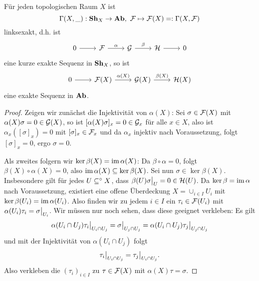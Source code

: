 \begin{lemma}
    \label{lemma:raum in garbe einsetzen ist linksexakt}
    Für jeden topologischen Raum $X$ ist
    \[\Gamma(X,\_): \mathbf{Sh}_X \to \mathbf{Ab},\ \mathcal{F} \mapsto \mathcal{F}(X) =: \Gamma(X,\mathcal{F})\] 
    linksexakt,
    d.h. ist
    \[\begin{tikzcd}
        0 \rar & \F \rar{\alpha} & \G \rar{\beta} & \cal H \rar & 0
    \end{tikzcd}\]
    eine kurze exakte Sequenz in $\mathbf{Sh}_X$, so ist
    \[\begin{tikzcd}
        0 \rar & \F(X) \rar{\alpha(X)} & \G(X) \rar{\beta(X)} & 
        \cal H(X)
    \end{tikzcd}\]
    eine exakte Sequenz in $\mathbf{Ab}$.
\end{lemma}
\begin{proof}
    Zeigen wir zunächst die Injektivität von $\alpha(X)$: Sei
    $\sigma \in \mathcal{F}(X)$ mit $\alpha(X)\sigma = 0\in \mathcal{G}(X)$, so ist
    $[\alpha(X)\sigma]_x  = 0 \in \mathcal{G}_x$ für alle $x \in X$, also ist
    $\alpha_x([\sigma]_x) = 0$ mit $[\sigma]_x \in \mathcal{F}_x$
    und da $\alpha_x$ injektiv nach Voraussetzung, folgt
    $[\sigma]_x = 0$, ergo $\sigma = 0$.
    
    Als zweites folgern wir $\ker \beta(X) = \operatorname{im} \alpha(X)$:
    Da $\beta \circ \alpha = 0$, folgt $\beta(X) \circ \alpha(X) = 0$,
    also $\operatorname{im}\alpha(X) \subseteq \ker \beta (X)$.
    Sei nun $\sigma \in \ker\beta (X)$. Insbesondere gilt für jedes 
    $U \subseteq^\circ X$, dass $\beta(U)\sigma\big|_{U} = 0 \in \mathcal H(U)$.
    Da $\ker \beta = \operatorname{im}\alpha$ nach Voraussetzung, existiert eine
    offene Überdeckung $X = \cup_{i\in I} U_i$ mit 
    $\ker\beta(U_i) = \operatorname{im}\alpha(U_i)$. Also finden wir zu jedem
    $i \in I$ ein $\tau_i \in \mathcal{F}(U_i)$ mit 
    $\alpha(U_i)\tau_i = \sigma\big|_{U_i}$. Wir müssen nur noch sehen, 
    dass diese geeignet verkleben:
    Es gilt
    \[\alpha(U_i \cap U_j)\tau_i\big|_{U_i \cap U_j} = \sigma\big|_{U_j\cap U_j}
         = \alpha(U_i \cap U_j) \tau_j\big|_{U_j \cap U_j}\]
    und mit der Injektivität von $\alpha(U_i \cap U_j)$ folgt
    \[\tau_i\big|_{U_i \cap U_j} = \tau_j\big|_{U_i \cap U_j}.\]
    Also verkleben die $(\tau_i)_{i\in I}$ zu $\tau \in \mathcal{F}(X)$ mit
    $\alpha(X)\tau = \sigma$.
\end{proof}

